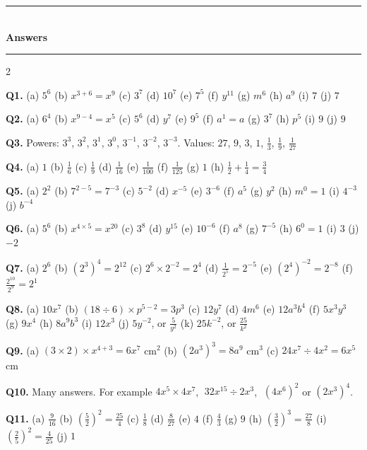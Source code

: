 \documentclass[12pt,a4paper]{article}
\newcommand{\heading}[1]{%
  \vspace{-5pt}
  {\color{blue!45!black}\rule{\linewidth}{1pt}}\\[1pt]
  {\large\bfseries #1}\\[-6pt]
  {\color{blue!45!black}\rule{\linewidth}{0.4pt}}
  \par\vspace{-6pt}}
\begin{document}
\newpage

\heading{Answers}

{\small
\begin{multicols}{2}
\raggedcolumns
\setlength{\parskip}{4pt}

\textbf{Q1.} (a) $5^6$ \quad (b) $x^{3+6}=x^9$ \quad (c) $3^7$ \quad
(d) $10^7$ \quad (e) $7^5$ \quad (f) $y^{11}$ \quad (g) $m^6$ \quad
(h) $a^9$ \quad (i) $7$ \quad (j) $7$

\textbf{Q2.} (a) $6^4$ \quad (b) $x^{9-4}=x^5$ \quad (c) $5^6$ \quad
(d) $y^7$ \quad (e) $9^5$ \quad (f) $a^1=a$ \quad (g) $3^7$ \quad (h) $p^5$
\quad (i) $9$ \quad (j) $9$

\textbf{Q3.} Powers: $3^3$, $3^2$, $3^1$, $3^0$, $3^{-1}$, $3^{-2}$, $3^{-3}$.
Values: $27$, $9$, $3$, $1$, $\frac13$, $\frac19$, $\frac1{27}$

\textbf{Q4.} (a) $1$ \quad (b) $\frac16$ \quad (c) $\frac19$ \quad
(d) $\frac1{16}$ \quad (e) $\frac1{100}$ \quad (f) $\frac1{125}$ \quad
(g) $1$ \quad (h) $\frac12+\frac14=\frac34$

\textbf{Q5.} (a) $2^2$ \quad (b) $7^{2-5}=7^{-3}$ \quad (c) $5^{-2}$ \quad
(d) $x^{-5}$ \quad (e) $3^{-6}$ \quad (f) $a^5$ \quad (g) $y^2$ \quad
(h) $m^0=1$ \quad (i) $4^{-3}$ \quad (j) $b^{-4}$

\textbf{Q6.} (a) $5^6$ \quad (b) $x^{4\times5}=x^{20}$ \quad (c) $3^8$ \quad
(d) $y^{15}$ \quad (e) $10^{-6}$ \quad (f) $a^8$ \quad (g) $7^{-5}$ \quad
(h) $6^0=1$ \quad (i) $3$ \quad (j) $-2$

\textbf{Q7.} (a) $2^6$ \quad (b) $(2^3)^4=2^{12}$ \quad
(c) $2^6\times2^{-2}=2^4$ \quad (d) $\frac1{2^5}=2^{-5}$ \quad
(e) $(2^4)^{-2}=2^{-8}$ \quad (f) $\frac{2^{10}}{2^9}=2^1$

\textbf{Q8.} (a) $10x^7$ \quad (b) $(18\div6)\times p^{5-2}=3p^3$ \quad
(c) $12y^7$ \quad (d) $4m^6$ \quad (e) $12a^3b^4$ \quad (f) $5x^3y^3$ \quad
(g) $9x^4$ \quad (h) $8a^9b^3$ \quad (i) $12x^3$ \quad
(j) $5y^{-2}$, or $\frac{5}{y^2}$ \quad (k) $25k^{-2}$, or $\frac{25}{k^2}$

\textbf{Q9.} (a) $(3\times2)\times x^{4+3}=6x^7$ cm$^2$ \quad
(b) $(2a^3)^3=8a^9$ cm$^3$ \quad (c) $24x^7\div4x^2=6x^5$ cm

\textbf{Q10.} Many answers. For example $4x^5\times4x^7$,
$\;32x^{15}\div2x^3$, $\;(4x^6)^2$ or $(2x^3)^4$.

\textbf{Q11.} (a) $\frac{9}{16}$ \quad (b) $\left(\frac52\right)^2=\frac{25}{4}$
\quad (c) $\frac18$ \quad (d) $\frac{8}{27}$ \quad (e) $4$ \quad
(f) $\frac43$ \quad (g) $9$ \quad (h) $\left(\frac32\right)^3=\frac{27}{8}$
\quad (i) $\left(\frac25\right)^2=\frac{4}{25}$ \quad (j) $1$


\end{multicols}}
\end{document}
